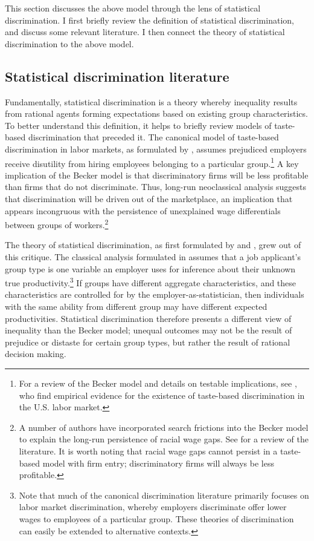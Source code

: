 This section discusses the above model through the lens of statistical discrimination.
I first briefly review the definition of statistical discrimination, and discuss some relevant literature.
I then connect the theory of statistical discrimination to the above model.

\subsection{Statistical discrimination literature}

Fundamentally, statistical discrimination is a theory whereby inequality results from rational agents forming expectations based on existing group characteristics.
To better understand this definition, it helps to briefly review models of taste-based discrimination that preceded it.
The canonical model of taste-based discrimination in labor markets, as formulated by \textcite{B57}, assumes prejudiced employers receive disutility from hiring employees belonging to a particular group.\footnote{
    For a review of the Becker model and details on testable implications, see \textcite{CG08}, who find empirical evidence for the existence of taste-based discrimination in the U.S. labor market.
} 
A key implication of the Becker model is that discriminatory firms will be less profitable than firms that do not discriminate. 
Thus, long-run neoclassical analysis suggests that discrimination will be driven out of the marketplace, an implication that appears incongruous with the persistence of unexplained wage differentials between groups of workers.\footnote{
    A number of authors have incorporated search frictions into the Becker model to explain the long-run persistence of racial wage gaps.
    See \textcite{LL12} for a review of the literature.
    It is worth noting that racial wage gaps cannot persist in a taste-based model with firm entry; discriminatory firms will always be less profitable. 
}


The theory of statistical discrimination, as first formulated by \textcite{A72} and \textcite{P72}, grew out of this critique.
The classical analysis formulated in \textcite{AC77} assumes that a job applicant's group type is one variable an employer uses for inference about their unknown true productivity.\footnote{
    Note that much of the canonical discrimination literature primarily focuses on labor market discrimination, whereby employers discriminate offer lower wages to employees of a particular group.
    These theories of discrimination can easily be extended to alternative contexts.
}
If groups have different aggregate characteristics, and these characteristics are controlled for by the employer-as-statistician, then individuals with the same ability from different group may have different expected productivities.
Statistical discrimination therefore presents a different view of inequality than the Becker model; unequal outcomes may not be the result of prejudice or distaste for certain group types, but rather the result of rational decision making.

